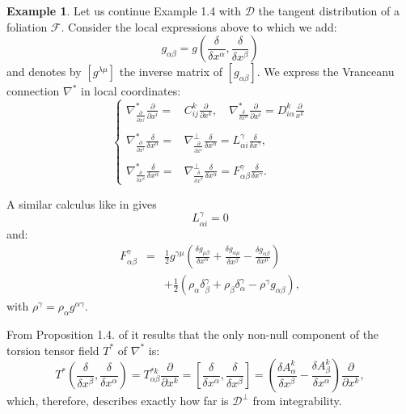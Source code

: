 \documentclass[11pt,oneside,english]{amsart}
\numberwithin{equation}{section}
\numberwithin{figure}{section}
\theoremstyle{plain}
\theoremstyle{definition}
\theoremstyle{definition}
\newtheorem{example}[thm]{Example}
\theoremstyle{plain}
\theoremstyle{plain}
\theoremstyle{remark}
\theoremstyle{remark}
\begin{document}
\begin{example}
Let us continue Example 1.4 with $\mathcal{D}$ the tangent distribution
of a foliation $\mathcal{F}.$ Consider the local expressions above
to which we add: \begin{equation}
g_{\alpha\beta}=g\left(\frac{\delta}{\delta x^{\alpha}},\frac{\delta}{\delta x^{\beta}}\right)\label{eq:20}\end{equation}
 and denotes by $[g^{\lambda\mu}]$ the inverse matrix of $[g_{\alpha\beta}]$.
We express the Vranceanu connection $\nabla^{*}$ in local coordinates:
\begin{equation}
\left\{ \begin{array}{ll}
\nabla_{\frac{\partial}{\partial x^{j}}}^{*}\frac{\partial}{\partial x^{i}}= & C_{ij}^{k}\frac{\partial}{\partial x^{k}},\quad\nabla_{\frac{\delta}{\delta x^{\alpha}}}^{*}\frac{\partial}{\partial x^{i}}=D_{i\alpha}^{k}\frac{\partial}{x^{k}}\\
\\\nabla_{\frac{\partial}{\partial x^{i}}}^{*}\frac{\delta}{\delta x^{\alpha}}= & \nabla_{\frac{\partial}{\partial x^{i}}}^{\bot}\frac{\delta}{\delta x^{\alpha}}=L_{\alpha i}^{\gamma}\frac{\delta}{\delta x^{\gamma}},\ \\
\\\nabla_{\frac{\delta}{\delta x^{\beta}}}^{*}\frac{\delta}{\delta x^{\alpha}}= & \nabla_{\frac{\delta}{\delta x^{\beta}}}^{\bot}\frac{\delta}{\delta x^{\alpha}}=F_{\alpha\beta}^{\gamma}\frac{\delta}{\delta x^{\gamma}}.\end{array}\right.\label{eq:21}\end{equation}

\end{example}
A similar calculus like in \cite[p. 99]{b:f} gives \[
L_{\alpha i}^{\gamma}=0\]
 and: \begin{eqnarray}
F_{\alpha\beta}^{\gamma} & = & \frac{1}{2}g^{\gamma\mu}\left(\frac{\delta g_{\mu\beta}}{\delta x^{\alpha}}+\frac{\delta g_{\alpha\mu}}{\delta x^{\beta}}-\frac{\delta g_{\alpha\beta}}{\delta x^{\mu}}\right)\label{eq:22}\\
 &  & +\frac{1}{2}\left(\rho_{\alpha}\delta_{\beta}^{\gamma}+\rho_{\beta}\delta_{\alpha}^{\gamma}-\rho^{\gamma}g_{\alpha\beta}\right),\nonumber \end{eqnarray}
 with $\rho^{\gamma}=\rho_{\alpha}g^{\alpha\gamma}$.

\medskip{}

From Proposition 1.4. of \cite[p. 100]{b:f} it results that the only
non-null component of the torsion tensor field $T^{*}$ of $\nabla^{*}$
is: \begin{equation}
T^{*}\left(\frac{\delta}{\delta x^{\beta}},\frac{\delta}{\delta x^{\alpha}}\right)=T_{\alpha\beta}^{*k}\frac{\partial}{\partial x^{k}}=\left[\frac{\delta}{\delta x^{\alpha}},\frac{\delta}{\delta x^{\beta}}\right]=\left(\frac{\delta A_{\alpha}^{k}}{\delta x^{\beta}}-\frac{\delta A_{\beta}^{k}}{\delta x^{\alpha}}\right)\frac{\partial}{\partial x^{k}},\label{eq:23}\end{equation}
 which, therefore, describes exactly how far is $\mathcal{D}^{\perp}$
from integrability.
\end{document}
